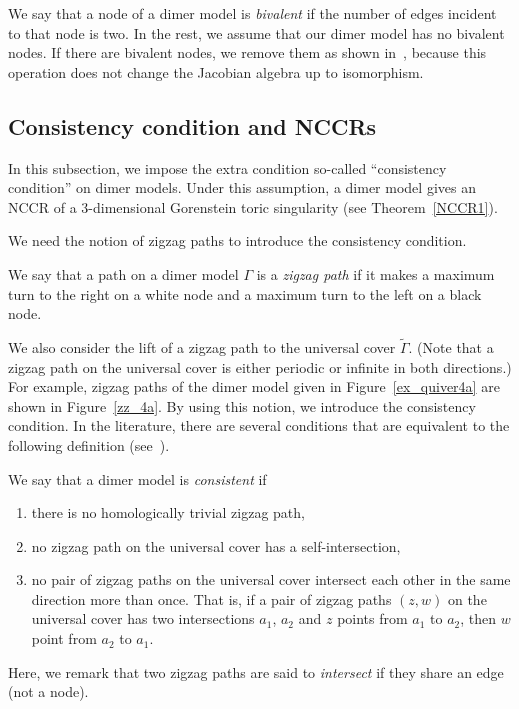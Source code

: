 \documentclass[ALCO,ThmDefs,Unicode]{cedram}
\begin{document}
We say that a node of a dimer model is \emph{bivalent} if the number of edges incident to that node is two. In the rest, we assume that our dimer model has no bivalent nodes. If there are bivalent nodes, we remove them as shown in~\cite[Figure~5.1]{IU1}, because this operation does not change the Jacobian algebra up to isomorphism.


\subsection{Consistency condition and NCCRs}\label{sec_consist}

In this subsection, we impose the extra condition so-called ``consistency condition'' on dimer models. Under this assumption, a dimer model gives an NCCR of a $3$-dimensional Gorenstein toric singularity (see Theorem~\ref{NCCR1}).

We need the notion of zigzag paths to introduce the consistency condition.

\begin{defi}
We say that a path on a dimer model $\Gamma$ is a \emph{zigzag path} if it makes a maximum turn to the right on a white node and a maximum turn to the left on a black node.
\end{defi}

We also consider the lift of a zigzag path to the universal cover $\widetilde{\Gamma}$. (Note that a zigzag path on the universal cover is either periodic or infinite in both directions.) For example, zigzag paths of the dimer model given in Figure~\ref{ex_quiver4a} are shown in Figure~\ref{zz_4a}. By using this notion, we introduce the consistency condition. In the literature, there are several conditions that are equivalent to the following definition (see~\cite{Boc1,IU1}).

\begin{defi}\label{def_consistent}
We say that a dimer model is \emph{consistent} if
\begin{enumerate}[\rm(1)]
\item there is no homologically trivial zigzag path,
\item no zigzag path on the universal cover has a self-intersection,
\item no pair of zigzag paths on the universal cover intersect each other in the same direction more than once. That is, if a pair of zigzag paths $(z,w)$ on the universal cover has two intersections $a_1$, $a_2$ and $z$ points from $a_1$ to $a_2$, then $w$ point from $a_2$ to $a_1$.
\end{enumerate}
Here, we remark that two zigzag paths are said to \emph{intersect} if they share an edge (not a node).
\end{defi}
\end{document}
